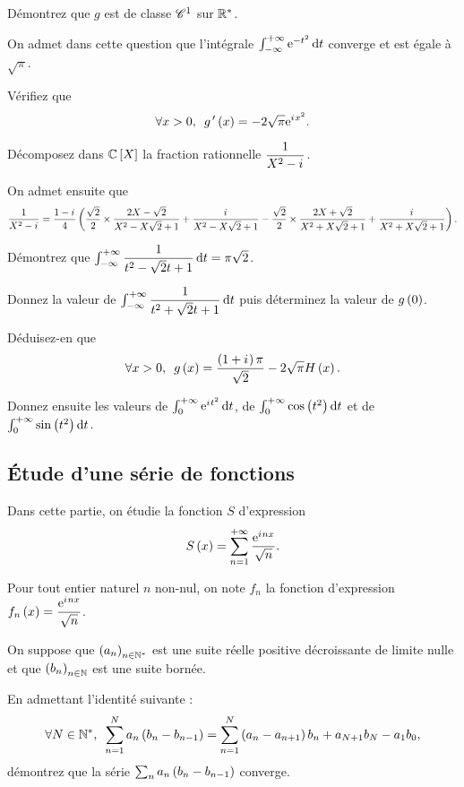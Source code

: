 \begin{q}
Démontrez que \(g\) est de classe \(\mathscr{C}^{1}\) sur \(\mathbb{R}^*\).
\end{q}

\begin{q}
On admet dans cette question que l'intégrale \(\int_{\minf}^{\pinf}\e{-t^2}\odif{t}\) converge et est égale à \(\sqrt{\pi}\).

Vérifiez que \[\quantifs{\forall x>0}g\prim\paren{x}=-2\sqrt{\pi}\e{\i x^2}.\]
\end{q}

\begin{q}
Décomposez dans \(\poly[\C]\) la fraction rationnelle \(\dfrac{1}{X^2-i\mkern1mu}\).

On admet ensuite que \[\dfrac{1}{X^2-i\mkern1mu}=\dfrac{1-i\mkern1mu}{4}\left(\dfrac{\sqrt{2}}{2}\times\dfrac{2X-\sqrt{2}}{X^2-X\sqrt{2}+1}+\dfrac{i\mkern1mu}{X^2-X\sqrt{2}+1}-\dfrac{\sqrt{2}}{2}\times\dfrac{2X+\sqrt{2}}{X^2+X\sqrt{2}+1}+\dfrac{i\mkern1mu}{X^2+X\sqrt{2}+1}\right).\]

Démontrez que \(\int_{\minf}^{\pinf}\dfrac{1}{t^2-\sqrt{2}t+1}\odif{t}=\pi\sqrt{2}\).

Donnez la valeur de \(\int_{\minf}^{\pinf}\dfrac{1}{t^2+\sqrt{2}t+1}\odif{t}\) puis déterminez la valeur de \(g\left(0\right)\).
\end{q}

\begin{q}
Déduisez-en que \[\quantifs{\forall x>0}g\paren{x}=\dfrac{\paren{1+\i}\pi}{\sqrt{2}}-2\sqrt{\pi}H\paren{x}.\]

Donnez ensuite les valeurs de \(\int_0^{\pinf}\e{\i t^2}\odif{t}\), de \(\int_0^{\pinf}\cos\paren{t^2}\odif{t}\) et de \(\int_0^{\pinf}\sin\paren{t^2}\odif{t}\).
\end{q}

\subsection*{Étude d'une série de fonctions}

Dans cette partie, on étudie la fonction \(S\) d'expression \[S\left(x\right)=\sum_{n=1}^{+\infty}\dfrac{\mathrm{e}^{i\mkern1mu nx}}{\sqrt{n}}.\]

Pour tout entier naturel \(n\) non-nul, on note \(f_n\) la fonction d'expression \(f_n\left(x\right)=\dfrac{\mathrm{e}^{i\mkern1mu nx}}{\sqrt{n}}\).

\begin{q}
On suppose que \(\left(a_n\right)_{n\in\mathbb{N}^*}\) est une suite réelle positive décroissante de limite nulle et que \(\left(b_n\right)_{n\in\mathbb{N}}\) est une suite bornée.

En admettant l'identité suivante : \[\quantifs{\forall N\in\Ns}\sum_{n=1}^Na_n\paren{b_n-b_{n-1}}=\sum_{n=1}^N\paren{a_n-a_{n+1}}b_n+a_{N+1}b_N-a_1b_0,\] démontrez que la série \(\sum_na_n\left(b_n-b_{n-1}\right)\) converge.
\end{q}

